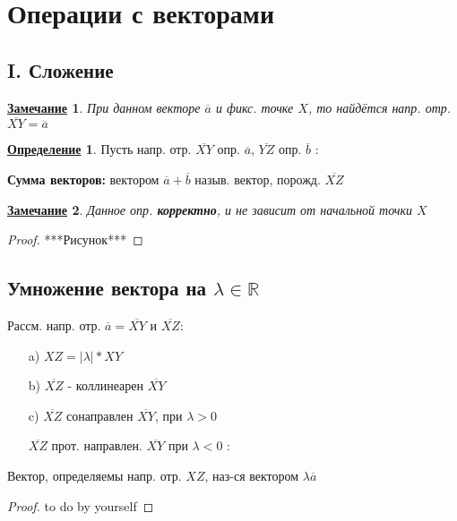 \documentclass[12pt]{article}
\newcommand{\R}{\mathbb{R}}
\newtheorem*{note}{\underline{Замечание}}
\theoremstyle{definition}
\newtheorem{definition}{\underline{Определение}}[section]
\theoremstyle{definition}
\begin{document}
\section{Операции с векторами}
\subsection{I. Сложение}
\begin{note}
При данном векторе $\overline{a}$ и фикс. точке $X$, то найдётся напр. отр. $\overline{XY} = \overline{a}$
\end{note}

\begin{definition}
Пусть напр. отр. $\overline{XY}$ опр. $\overline{a}$, $\overline{YZ}$ опр. $\overline{b}$ :

\textbf{Сумма векторов:} вектором $\overline{a} + \overline{b}$  назыв. вектор, порожд. $\overline{XZ}$
\end{definition}
\begin{note}
Данное опр. \textbf{корректно}, и не зависит от начальной точки $X$
\end{note}
\begin{proof}
***Рисунок***
\end{proof}

\subsection{Умножение вектора на $\lambda \in \R$}
Рассм. напр. отр. $\overline{a} = \overline{XY}$ и $\overline{XZ} \colon $
\begin{itemize}
    \item [a) ] $XZ = |\lambda| * XY$ 
    \item [b) ] $\overline{XZ}$ - коллинеарен $\overline{XY}$ 
    \item [c) ] $\overline{XZ}$ сонаправлен $\overline{XY}$, при $\lambda > 0$ 

        $\overline{XZ}$ прот. направлен. $\overline{XY}$ при $\lambda < 0$ :
\end{itemize}

Вектор, определяемы напр. отр. $XZ$, наз-ся вектором $\lambda \overline{a}$ 

\begin{proof}
to do by yourself
\end{proof}
\end{document}
